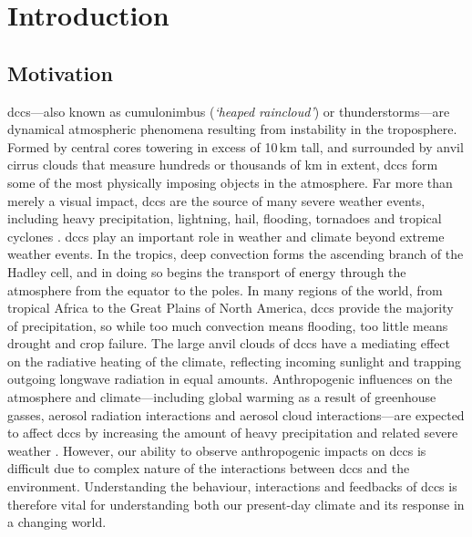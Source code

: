 \chapter{Introduction} \label{chp:introduction}

\section{Motivation}

\acrlong{dcc}s---also known as cumulonimbus (\textit{`heaped raincloud'}) or thunderstorms---are dynamical atmospheric phenomena resulting from instability in the troposphere.
Formed by central cores towering in excess of 10\,\unit{km} tall, and surrounded by anvil cirrus clouds that measure hundreds or thousands of km in extent, \acrshort{dcc}s form some of the most physically imposing objects in the atmosphere.
Far more than merely a visual impact, \acrshort{dcc}s are the source of many severe weather events, including heavy precipitation, lightning, hail, flooding, tornadoes and tropical cyclones \citep{westra_future_2014, houze_chapter_2014, williams_radar_1992, bruning_theory_2013, punge_hail_2016, matsudo_severe_2011}.
\acrshort{dcc}s play an important role in weather and climate beyond extreme weather events.
In the tropics, deep convection forms the ascending branch of the Hadley cell, and in doing so begins the transport of energy through the atmosphere from the equator to the poles.
In many regions of the world, from tropical Africa to the Great Plains of North America, \acrshort{dcc}s provide the majority of precipitation, so while too much convection means flooding, too little means drought and crop failure.
The large anvil clouds of \acrshort{dcc}s have a mediating effect on the radiative heating of the climate, reflecting incoming sunlight and trapping outgoing longwave radiation in equal amounts.
Anthropogenic influences on the atmosphere and climate---including global warming as a result of greenhouse gasses, aerosol radiation interactions and aerosol cloud interactions---are expected to affect \acrshort{dcc}s by increasing the amount of heavy precipitation and related severe weather \citep[e.g.][]{allen_constraints_2002, trenberth_changing_2003, held_robust_2006, khain2005aerosol, koren_smoke_2008, rosenfeld_flood_2008, fan_microphysical_2013, fan_review_2016}.
However, our ability to observe anthropogenic impacts on \acrshort{dcc}s is difficult due to complex nature of the interactions between \acrshort{dcc}s and the environment.
Understanding the behaviour, interactions and feedbacks of \acrshort{dcc}s is therefore vital for understanding both our present-day climate and its response in a changing world.

